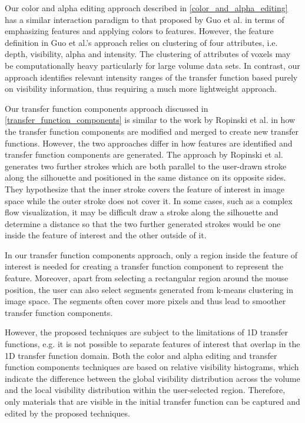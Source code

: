 \documentclass[twoside,twocolumn,10pt]{article}
\begin{document}

Our color and alpha editing approach described in \autoref{color_and_alpha_editing} has a similar interaction paradigm to that proposed by Guo et al. \cite{guo_wysiwyg_2011} in terms of emphasizing features and applying colors to features. However, the feature definition in Guo et al.'s approach relies on clustering of four attributes, i.e. depth, visibility, alpha and intensity. The clustering of attributes of voxels may be computationally heavy particularly for large volume data sets.
In contrast, our approach identifies relevant intensity ranges of the transfer function based purely on visibility information, thus requiring a much more lightweight approach.

Our transfer function components approach discussed in \autoref{transfer_function_components} is similar to the work by Ropinski et al. \cite{ropinski_stroke-based_2008} in how the transfer function components are modified and merged to create new transfer functions.
However, the two approaches differ in how features are identified and transfer function components are generated.
The approach by Ropinski et al. generates two further strokes which are both parallel to the user-drawn stroke along the silhouette and positioned in the same distance on its opposite sides. 
They hypothesize that the inner stroke covers the feature of interest in image space while the outer stroke does not cover it.
In some cases, such as a complex flow visualization, it may be difficult draw a stroke along the silhouette and determine a distance so that the two further generated strokes would be one inside the feature of interest and the other outside of it.

In our transfer function components approach, only a region inside the feature of interest is needed for creating a transfer function component to represent the feature. Moreover, apart from selecting a rectangular region around the mouse position, the user can also select segments generated from k-means clustering in image space. The segments often cover more pixels and thus lead to smoother transfer function components.

However, the proposed techniques are subject to the limitations of 1D transfer functions, e.g. it is not possible to separate features of interest that overlap in the 1D transfer function domain.
Both the color and alpha editing and transfer function components techniques are based on relative visibility histograms, which indicate the difference between the global visibility distribution across the volume and the local visibility distribution within the user-selected region. Therefore, only materials that are visible in the initial transfer function can be captured and edited by the proposed techniques.
\end{document}
